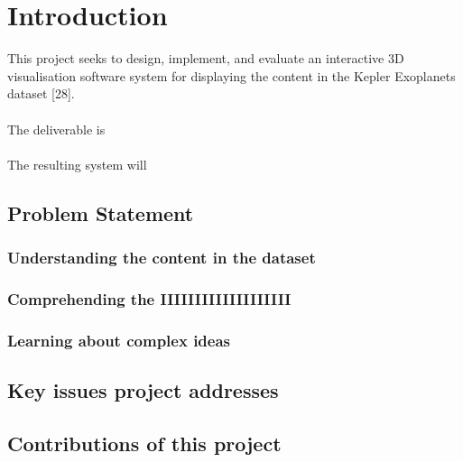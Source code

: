 \chapter{Introduction}\label{C:intro}
This project seeks to design, implement, and evaluate an interactive 3D visualisation
software system for displaying the content in the Kepler Exoplanets dataset [28]. 
\\\\
The deliverable is 
\\\\
The resulting system will

\section{Problem Statement}
\subsection{Understanding the content in the dataset}
\subsection{Comprehending the IIIIIIIIIIIIIIIIIII}
\subsection{Learning about complex ideas}

\section{Key issues project addresses}

\section{Contributions of this project}
